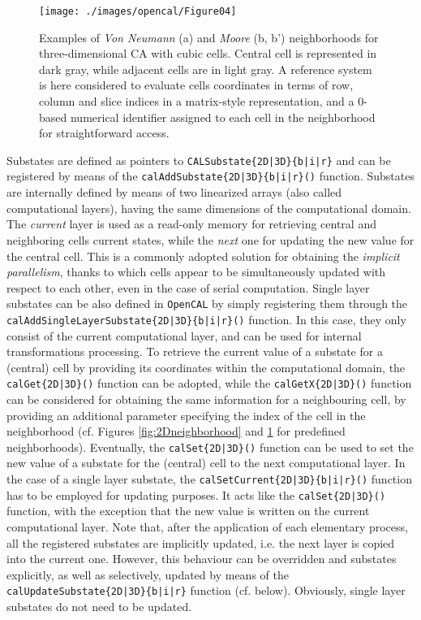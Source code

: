 \begin{figure}[!htbp]
	\begin{center}
		\texttt{[image: ./images/opencal/Figure04]}
		\caption[Examples of \textit{Von Neumann} and \textit{Moore} neighborhoods for three-dimensional CA with cubic cells.]{Examples of \textit{Von Neumann} (a) and \textit{Moore} (b, b') neighborhoods for three-dimensional CA with cubic cells. Central cell is represented in dark gray, while adjacent cells are in light gray. A reference system is here considered to evaluate cells coordinates in terms of row,
		column and slice indices in a matrix-style representation, and a
		0-based numerical identifier assigned to each cell in the neighborhood
		for straightforward access.}
		\label{fig:3Dneighborhood}
	\end{center}
\end{figure}
Substates are defined as pointers to
\verb'CALSubstate{2D|3D}{b|i|r}' and can be registered by means of
the \verb'calAddSubstate{2D|3D}{b|i|r}()' function. Substates are
internally defined by means of two linearized arrays (also called
computational layers), having the same dimensions of the
computational domain. The \emph{current} layer is used as a
read-only memory for retrieving central and neighboring cells
current states, while the \emph{next} one for updating the new value
for the central cell. This is a commonly adopted solution for
obtaining the \emph{implicit parallelism}, thanks to which cells
appear to be simultaneously updated with respect to each other, even
in the case of serial computation. Single layer substates can be
also defined in \texttt{OpenCAL} by simply registering them through the
\verb'calAddSingleLayerSubstate{2D|3D}{b|i|r}()' function. In this
case, they only consist of the current computational layer, and can
be used for internal transformations processing. To retrieve the
current value of a substate for a (central) cell by providing its
coordinates within the computational domain, the
\verb'calGet{2D|3D}()' function can be adopted, while the
\verb'calGetX{2D|3D}()' function can be considered for obtaining the
same information for a neighbouring cell, by providing an additional
parameter specifying the index of the cell in the neighborhood
(cf. Figures \ref{fig:2Dneighborhood} and \ref{fig:3Dneighborhood}
for predefined neighborhoods). Eventually, the
\verb'calSet{2D|3D}()' function can be used to set the new value of
a substate for the (central) cell to the next computational
layer. In the case of a single layer substate, the
\verb'calSetCurrent{2D|3D}{b|i|r}()' function has to be employed for
updating purposes. It acts like the \verb'calSet{2D|3D}()' function,
with the exception that the new value is written on the current
computational layer. Note that, after the application of each
elementary process, all the registered substates are implicitly
updated, i.e. the next layer is copied into the current
one. However, this behaviour can be overridden and substates
explicitly, as well as selectively, updated by means of the
\verb'calUpdateSubstate{2D|3D}{b|i|r}' function
(cf. below). Obviously, single layer substates do not need to be
updated.

